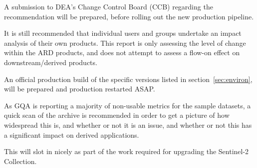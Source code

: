 \documentclass[a4paper]{article}
\begin{document}
    \begin{flushleft}
      A submission to DEA's Change Control Board (CCB) regarding the recommendation will be prepared, before rolling out the new production pipeline. \par
      It is still recommended that individual users and groups undertake an impact analysis of their own products. This report is only assessing the level of change within the ARD products, and does not attempt to assess a flow-on effect on downstream/derived products. \par
      An official production build of the specific versions listed in section~\ref{sec:environ}, will be prepared and production restarted ASAP.
    \end{flushleft}

    \begin{flushleft}
      As GQA is reporting a majority of non-usable metrics for the sample datasets, a quick scan of the archive is recommended in order to get a picture of how widespread this is, and whether or not it is an issue, and whether or not this has a significant impact on derived applications. \par
      This will slot in nicely as part of the work required for upgrading the Sentinel-2 Collection.
    \end{flushleft}
\end{document}
